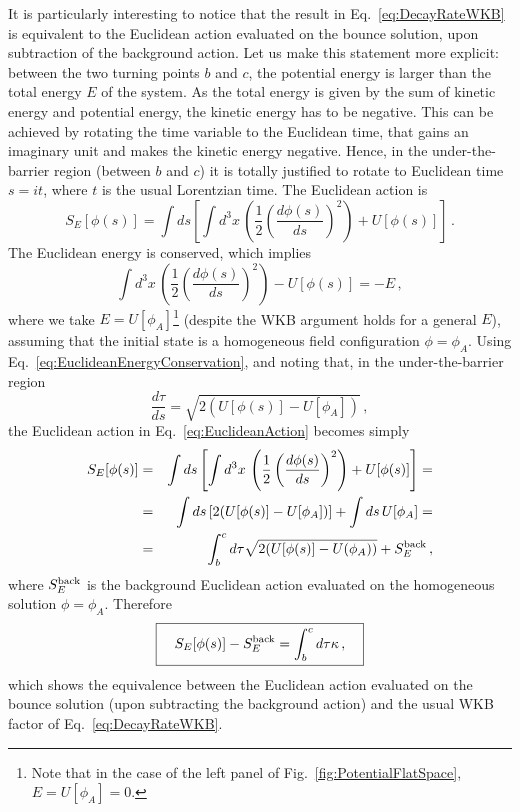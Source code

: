 \documentclass[a4paper,11pt]{article}
\numberwithin{equation}{section}
\newcommand{\be}{\begin{equation}}
\newcommand{\ee}{\end{equation}}
\begin{document}
It is particularly interesting to notice that the result in Eq.~\eqref{eq:DecayRateWKB} is equivalent to the Euclidean action evaluated on the bounce solution, upon subtraction of the background action. Let us make this statement more explicit: between the two turning points $b$ and $c$, the potential energy is larger than the total energy $E$ of the system. As the total energy is given by the sum of kinetic energy and potential energy, the kinetic energy has to be negative. This can be achieved by rotating the time variable to the Euclidean time, that gains an imaginary unit and makes the kinetic energy negative. Hence, in the under-the-barrier region (between $b$ and $c$) it is totally justified to rotate to Euclidean time $s = i t$, where $t$ is the usual Lorentzian time. The Euclidean action is
\be
\label{eq:EuclideanAction}
S_E[\phi(s)] = \int ds \left[ \int d^3 x \, \left( \frac{1}{2} \left(\frac{d\phi(s)}{ds}\right)^2 \right) + U[\phi(s)]\right] \,.
\ee
The Euclidean energy is conserved, which implies
\be
\label{eq:EuclideanEnergyConservation}
\int d^3 x \, \left(\frac{1}{2} \left(\frac{d\phi(s)}{ds}\right)^2\right) - U[\phi(s)] = -E \,,
\ee
where we take $E = U[\phi_A]$\footnote{Note that in the case of the left panel of Fig.~\ref{fig:PotentialFlatSpace}, $E = U[\phi_A] = 0$.} (despite the WKB argument holds for a general $E$), assuming that the initial state is a homogeneous field configuration $\phi = \phi_A$. Using Eq.~\eqref{eq:EuclideanEnergyConservation}, and noting that, in the under-the-barrier region
\be
\frac{d\tau}{ds} = \sqrt{2(U[\phi(s)] - U[\phi_A])} \,,
\ee
the Euclidean action in Eq.~\eqref{eq:EuclideanAction} becomes simply
\begin{eqnarray}
S_E[\phi(s)] &=& \int ds \left[ \int d^3 x \, \left( \frac{1}{2} \left(\frac{d\phi(s)}{ds}\right)^2 \right) + U[\phi(s)]\right] = \nonumber \\
&=& \int ds \left[2 (U[\phi(s)] - U[\phi_A])\right] + \int ds \, U[\phi_A] = \nonumber \\
&=& \int_b^c d\tau \sqrt{2(U[\phi(s)] - U(\phi_A))} + S_E^{\rm back} \,,
\label{eq:EuclideanAction2}
\end{eqnarray}
where $S_E^{\rm back}$ is the background Euclidean action evaluated on the homogeneous solution $\phi = \phi_A$. Therefore
\be
\boxed{\quad S_E[\phi(s)] - S_E^{\rm back} = \int_b^c d\tau \kappa \,,\quad }
\ee
which shows the equivalence between the Euclidean action evaluated on the bounce solution (upon subtracting the background action) and the usual WKB factor of Eq.~\eqref{eq:DecayRateWKB}.
\end{document}
